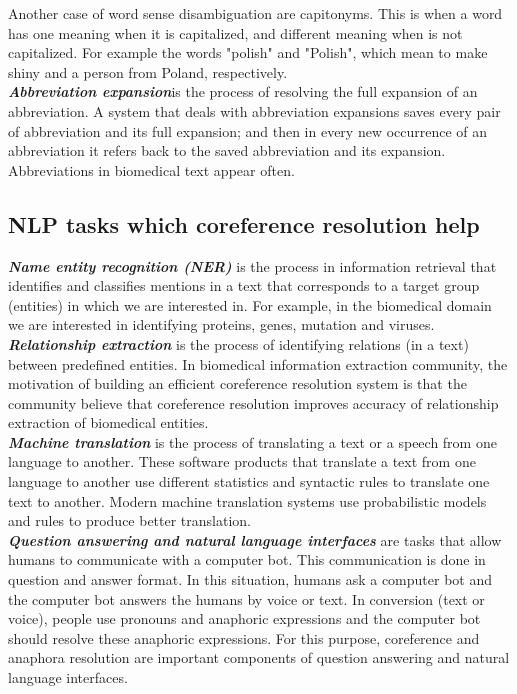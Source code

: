 Another case of word sense disambiguation are capitonyms. This is when a word has one meaning when it is capitalized, and different meaning when is not capitalized. For example the words "polish" and "Polish", which mean to make shiny and a person from Poland, respectively. \\

\emph{\textbf{Abbreviation expansion}}is the process of resolving the full expansion of an abbreviation. A system that deals with abbreviation expansions saves every pair of abbreviation and its full expansion; and then in every new occurrence of an abbreviation it refers back to the saved abbreviation and its expansion. Abbreviations in biomedical text appear often. \\

\subsection{NLP tasks which coreference resolution help}

\emph {\textbf{ Name entity recognition (NER)}} is the process in information retrieval that identifies and classifies mentions in a text that corresponds to a target group (entities) in which we are interested in. For example, in the biomedical domain we are interested in identifying proteins, genes, mutation and viruses. \\

\emph{\textbf{Relationship extraction}} is the process of identifying relations (in a text) between predefined entities. In biomedical information extraction community, the motivation of building an efficient coreference resolution system is that the community believe that coreference resolution improves accuracy of relationship extraction of biomedical entities. \\

\emph{\textbf{Machine translation}} is the process of translating a text or a speech from one language to another. These software products that translate a text from one language to another use different statistics and syntactic rules to translate one text to another. Modern machine translation systems use probabilistic models and rules to produce better translation. \\

\emph{\textbf{Question answering and natural language interfaces}} are tasks that allow humans to communicate with a computer bot. This communication is done in question and answer format. In this situation, humans ask a computer bot and the computer bot answers the humans by voice or text. In conversion (text or voice), people use pronouns and anaphoric expressions and the computer bot should resolve these anaphoric expressions. For this purpose, coreference and anaphora resolution are important components of question answering and natural language interfaces.\\

